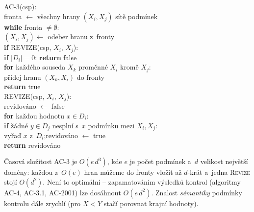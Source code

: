 \begin{algo}
\ttfamily\small
AC-3(csp): \\
\hspace*{1.5em}fronta $\leftarrow$ všechny hrany $(X_i,X_j)$ sítě podmínek\\
\hspace*{1.5em}\textbf{while} fronta $\neq \emptyset$:\\
\hspace*{3em}$(X_i,X_j) \leftarrow$ odeber hranu z~fronty\\
\hspace*{3em}\textbf{if} REVIZE(csp, $X_i$, $X_j$): \\
\hspace*{4.5em}\textbf{if} $|D_i| = 0$: \textbf{return} false \\
\hspace*{4.5em}\textbf{for} každého souseda $X_k$ proměnné $X_i$ kromě $X_j$:\\
\hspace*{6em}přidej hranu $(X_k, X_i)$ do fronty \\
\hspace*{1.5em}\textbf{return} true\\[4pt]
REVIZE(csp, $X_i$, $X_j$): \\
\hspace*{1.5em}revidováno $\leftarrow$ false\\
\hspace*{1.5em}\textbf{for} každou hodnotu $x \in D_i$:\\
\hspace*{3em}\textbf{if} žádné $y \in D_j$ nesplní s~$x$ podmínku mezi $X_i, X_j$: \\
\hspace*{4.5em}vyřaď $x$ z~$D_i$;\quad revidováno $\leftarrow$ true\\
\hspace*{1.5em}\textbf{return} revidováno
\end{algo}

\begin{poznamka}
Časová složitost AC-3 je $O(e\,d^{3})$, kde $e$ je počet podmínek a~$d$ velikost největší domény: každou z~$O(e)$ hran můžeme do fronty vložit až $d$-krát a~jedna \textsc{Revize} stojí $O(d^{2})$. Není to optimální -- zapamatováním výsledků kontrol (algoritmy AC-4, AC-3.1, AC-2001) lze dosáhnout $O(e\,d^{2})$. Znalost \emph{sémantiky} podmínky kontrolu dále zrychlí (pro $X<Y$ stačí porovnat krajní hodnoty).
\end{poznamka}

